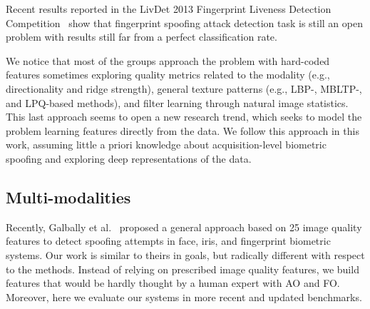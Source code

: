 Recent results reported in the LivDet 2013 Fingerprint Liveness Detection Competition~\cite{Ghiani:BTAS:2013} show that fingerprint spoofing attack detection task is still an open problem with results still far from a perfect classification rate.

We notice that most of the groups approach the problem with hard-coded features sometimes exploring quality metrics related to the modality (e.g., directionality and ridge strength), general texture patterns (e.g., LBP-, MBLTP-, and LPQ-based methods), and filter learning through natural image statistics. This last approach seems to open a new research trend, which seeks to model the problem learning features directly from the data. We follow this approach in this work, assuming little a priori knowledge about acquisition-level biometric spoofing and exploring deep representations of the data.



\subsection{Multi-modalities}

Recently, Galbally et al.~\cite{Galbally:TIP:2014} proposed a general approach based on 25 image quality features to detect spoofing attempts in face, iris, and fingerprint biometric systems. Our work is similar to theirs in goals, but radically different with respect to the methods.
Instead of relying on prescribed image quality features, we build features that would be hardly thought by a human expert with AO and FO.
Moreover, here we evaluate our systems in more recent and updated benchmarks.


